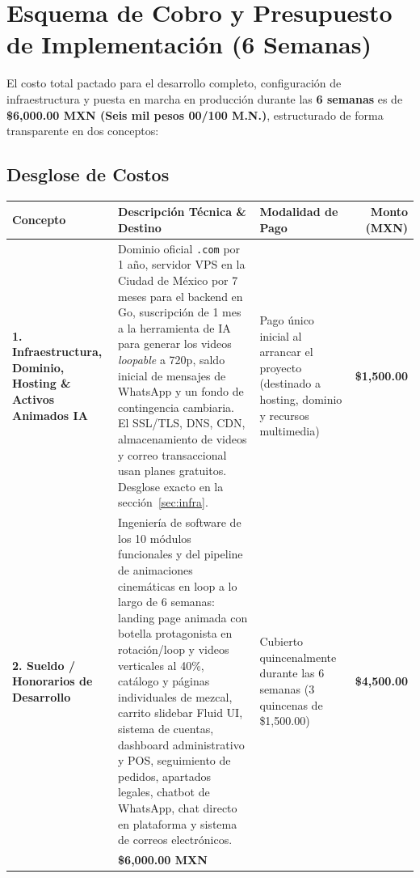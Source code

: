\documentclass[11pt,letterpaper]{article}
\begin{document}
\section{Esquema de Cobro y Presupuesto de Implementación (6 Semanas)}

El costo total pactado para el desarrollo completo, configuración de infraestructura y puesta en marcha en producción durante las \textbf{6 semanas} es de \textbf{\$6,000.00 MXN (Seis mil pesos 00/100 M.N.)}, estructurado de forma transparente en dos conceptos:

\subsection{Desglose de Costos}

\begin{table}[H]
\centering
\small
\begin{tabularx}{\textwidth}{>{\raggedright\arraybackslash}p{3.6cm}>{\raggedright\arraybackslash}X>{\raggedright\arraybackslash}p{3.0cm}r}
\toprule
\rowcolor{MezcalAgave!15}
\textbf{Concepto} & \textbf{Descripción Técnica \& Destino} & \textbf{Modalidad de Pago} & \textbf{Monto (MXN)} \\
\midrule
\textbf{1. Infraestructura, Dominio, Hosting \& Activos Animados IA} & 
Dominio oficial \texttt{.com} por 1 año, servidor VPS en la Ciudad de México por 7 meses para el backend en Go, suscripción de 1 mes a la herramienta de IA para generar los videos \textit{loopable} a 720p, saldo inicial de mensajes de WhatsApp y un fondo de contingencia cambiaria. El SSL/TLS, DNS, CDN, almacenamiento de videos y correo transaccional usan planes gratuitos. Desglose exacto en la sección~\ref{sec:infra}. &
Pago único inicial al arrancar el proyecto (destinado a hosting, dominio y recursos multimedia) &
\textbf{\$1,500.00} \\
\midrule
\textbf{2. Sueldo / Honorarios de Desarrollo} & 
Ingeniería de software de los 10 módulos funcionales y del pipeline de animaciones cinemáticas en loop a lo largo de 6 semanas: landing page animada con botella protagonista en rotación/loop y videos verticales al 40\%, catálogo y páginas individuales de mezcal, carrito slidebar Fluid UI, sistema de cuentas, dashboard administrativo y POS, seguimiento de pedidos, apartados legales, chatbot de WhatsApp, chat directo en plataforma y sistema de correos electrónicos. & 
Cubierto quincenalmente durante las 6 semanas (3 quincenas de \$1,500.00) &
\textbf{\$4,500.00} \\
\midrule
\rowcolor{MezcalGold!20}
\multicolumn{3}{l}{\textbf{TOTAL DEL PROYECTO LLAVE EN MANO (6 SEMANAS):}} & \textbf{\$6,000.00 MXN} \\
\bottomrule
\end{tabularx}
\end{table}
\end{document}
